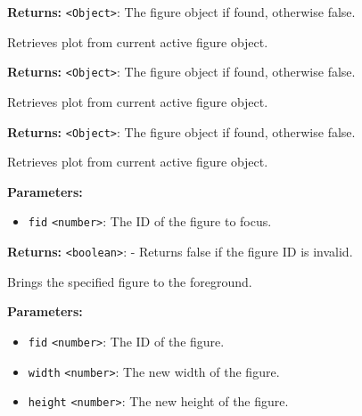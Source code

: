 \documentclass[12pt,a4paper]{article}
\begin{document}
\noindent \textbf{Returns:} \texttt{<Object>}: The figure object if found, otherwise \textasciigrave{}false\textasciigrave{}.

\noindent Retrieves plot from current active figure object.

\vspace{5mm}
\noindent {}


\noindent \textbf{Returns:} \texttt{<Object>}: The figure object if found, otherwise \textasciigrave{}false\textasciigrave{}.

\noindent Retrieves plot from current active figure object.

\vspace{5mm}
\noindent {}


\noindent \textbf{Returns:} \texttt{<Object>}: The figure object if found, otherwise \textasciigrave{}false\textasciigrave{}.

\noindent Retrieves plot from current active figure object.

\vspace{5mm}
\noindent {}


\noindent \textbf{Parameters:}
\begin{itemize}
  \item \texttt{fid} \texttt{<number>}: The ID of the figure to focus.
\end{itemize}

\noindent \textbf{Returns:} \texttt{<boolean>}: - Returns false if the figure ID is invalid.

\noindent Brings the specified figure to the foreground.

\vspace{5mm}
\noindent {}


\noindent \textbf{Parameters:}
\begin{itemize}
  \item \texttt{fid} \texttt{<number>}: The ID of the figure.
  \item \texttt{width} \texttt{<number>}: The new width of the figure.
  \item \texttt{height} \texttt{<number>}: The new height of the figure.
\end{itemize}
\end{document}
